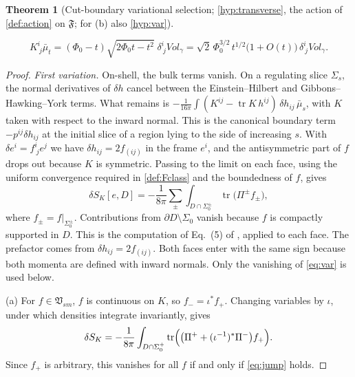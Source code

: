 \documentclass[11pt]{article}
\theoremstyle{canonmath}
\theoremstyle{canonpostulate}
\theoremstyle{canonproposition}
\theoremstyle{canonmath}
\newtheorem{mainthm}{Theorem}
\theoremstyle{canonproposition}
\providecommand{\Vsm}{\mathfrak{V}_{\mathrm{sm}}}
\providecommand{\Fcl}{\mathfrak{F}}
\providecommand{\Klein}{\mathcal{K}}
\def\mathrm#1{#1}%
\def\mathcal#1{#1}%
\begin{document}
\begin{mainthm}[Cut-boundary variational selection; \ref{hyp:transverse}, the action of \cref{def:action} on $\Fcl$; for (b) also \ref{hyp:var}]
\begin{enumerate}[label=(\alph*)]
\begin{equation}
K^i_{\ j}\bar\mu_t = (\Phi_0-t)\sqrt{2\Phi_0t-t^2}\;\delta^i_{\ j}\mathrm{Vol}_\gamma = \sqrt2\,\Phi_0^{3/2}\,t^{1/2}\bigl(1+O(t)\bigr)\,\delta^i_{\ j}\mathrm{Vol}_\gamma .
\label{eq:roundKmu}
\end{equation}
\end{enumerate}
\end{mainthm}

\begin{proof}
\emph{First variation.} On-shell, the bulk terms vanish. On a regulating slice $\Sigma_s$, the normal derivatives of $\delta h$ cancel between the Einstein--Hilbert and Gibbons--Hawking--York terms. What remains is $-\tfrac1{16\pi}\int(K^{ij}-\operatorname{tr}K\,h^{ij})\,\delta h_{ij}\,\bar\mu_s$, with $K$ taken with respect to the inward normal. This is the canonical boundary term $-p^{ij}\delta h_{ij}$ at the initial slice of a region lying to the side of increasing $s$. With $\delta e^i = f^i_{\ j}e^j$ we have $\delta h_{ij} = 2f_{(ij)}$ in the frame $e^i$, and the antisymmetric part of $f$ drops out because $K$ is symmetric. Passing to the limit on each face, using the uniform convergence required in \cref{def:Fclass} and the boundedness of $f$, gives
\begin{equation}
\delta\mathcal{S}_{\Klein}[e,\mathcal{D}] = -\frac{1}{8\pi}\sum_\pm\int_{\mathcal{D}\cap\Sigma_0^\pm}\operatorname{tr}\bigl(\Pi^\pm f_\pm\bigr),
\label{eq:var}
\end{equation}
where $f_\pm = f|_{\Sigma_0^\pm}$. Contributions from $\partial\mathcal{D}\setminus\Sigma_0$ vanish because $f$ is compactly supported in $\mathcal{D}$. This is the computation of Eq.~(5) of \cite{TBT2026}, applied to each face. The prefactor comes from $\delta h_{ij} = 2f_{(ij)}$. Both faces enter with the same sign because both momenta are defined with inward normals. Only the vanishing of \eqref{eq:var} is used below.

(a) For $f\in\Vsm$, $f$ is continuous on $\Klein$, so $f_- = \iota^*f_+$. Changing variables by $\iota$, under which densities integrate invariantly, gives
\[
\delta\mathcal{S}_{\Klein} = -\frac{1}{8\pi}\int_{\mathcal{D}\cap\Sigma_0^+}\operatorname{tr}\Bigl(\bigl(\Pi^+ + (\iota^{-1})^*\Pi^-\bigr)f_+\Bigr).
\]
Since $f_+$ is arbitrary, this vanishes for all $f$ if and only if \eqref{eq:jump} holds.


\end{proof}
\end{document}
